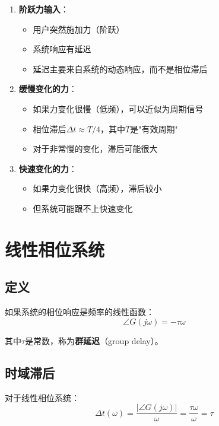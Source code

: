 \documentclass[12pt,a4paper]{article}
\begin{document}
\begin{enumerate}
\item \textbf{阶跃力输入}：
\begin{itemize}
\item 用户突然施加力（阶跃）
\item 系统响应有延迟
\item 延迟主要来自系统的动态响应，而不是相位滞后
\end{itemize}

\item \textbf{缓慢变化的力}：
\begin{itemize}
\item 如果力变化很慢（低频），可以近似为周期信号
\item 相位滞后$\Delta t \approx T/4$，其中$T$是"有效周期"
\item 对于非常慢的变化，滞后可能很大
\end{itemize}

\item \textbf{快速变化的力}：
\begin{itemize}
\item 如果力变化很快（高频），滞后较小
\item 但系统可能跟不上快速变化
\end{itemize}
\end{enumerate}

\section{线性相位系统}

\subsection{定义}

如果系统的相位响应是频率的线性函数：
\begin{equation}
\angle G(j\omega) = -\tau \omega
\end{equation}

其中$\tau$是常数，称为\textbf{群延迟}（group delay）。

\subsection{时域滞后}

对于线性相位系统：
\begin{equation}
\Delta t(\omega) = \frac{|\angle G(j\omega)|}{\omega} = \frac{\tau \omega}{\omega} = \tau
\end{equation}
\end{document}
